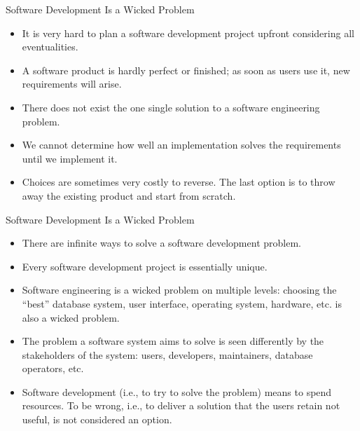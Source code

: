 \documentclass{beamer}
\begin{document}
\begin{frame}{\centerline{Software Development Is a Wicked Problem}}
\small
\begin{itemize}
\item It is very hard to plan a software development project upfront considering all eventualities.

\item A software product is hardly perfect or finished; as soon as users use it, new requirements will arise.

\item There does not exist the one single solution to a software engineering problem.

\item We cannot determine how well an implementation solves the requirements until we implement it.

\item Choices are sometimes very costly to reverse. The last option is to throw away the existing product and start from scratch.

\end{itemize}

\end{frame}
\begin{frame}{\centerline{Software Development Is a Wicked Problem}}
\small 
\begin{itemize}
\item There are infinite ways to solve a software development problem.

\item Every software development project is essentially unique.

\item Software engineering is a wicked problem on multiple levels: choosing the ``best'' database system, user interface, operating system, hardware, etc. is also a wicked problem.

\item The problem a software system aims to solve is seen differently by the stakeholders of the system: users, developers, maintainers, database operators, etc.

\item Software development (i.e., to try to solve the problem) means to spend resources. To be wrong, i.e., to deliver a solution that the users retain not useful, is not considered an option.

\end{itemize}

\end{frame}
\end{document}
